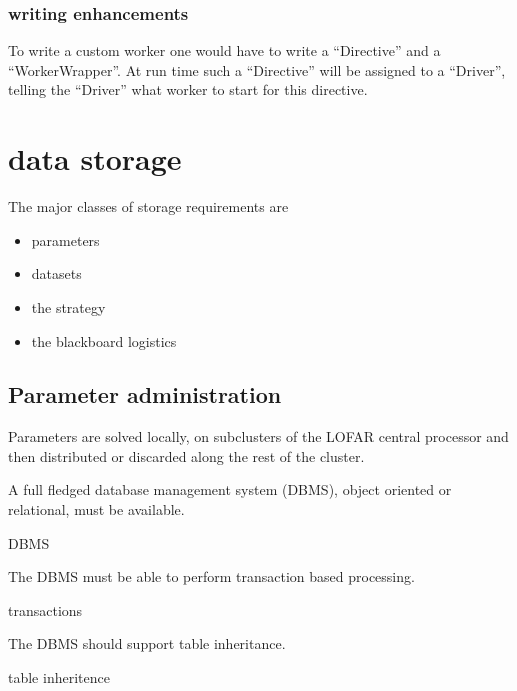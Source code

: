 \documentclass[]{lofar}
\begin{document}
      \subsubsection{writing enhancements}

        To write a custom worker one would have to write a ``Directive''
        and a ``WorkerWrapper''. At run time such a ``Directive'' will be
        assigned to a ``Driver'', telling the ``Driver'' what worker
        to start for this directive.

  \section{data storage}
  \label{sec:data-storage}\hypertarget{sec:data-storage}{}

    The major classes of storage requirements are

    \begin{itemize}
      \item parameters
      \item datasets
      \item the strategy
      \item the blackboard logistics
    \end{itemize}

    \subsection{Parameter administration}
    \label{subsec:parameter-administration}\hypertarget{subsec:parameter-administration}{}

      Parameters are solved locally, on subclusters of the LOFAR
      central processor and then distributed or discarded along the
      rest of the cluster.

      \begin{prerequisite}
        A full fledged database management system (DBMS),
        object oriented or relational, must be available.
        \caption{DBMS\label{pre:dbms}}
      \end{prerequisite}

      \begin{prerequisite}
        The DBMS must be able to perform transaction based processing.
        \caption{transactions\label{pre:transactions}}
      \end{prerequisite}

      \begin{prerequisite}
        The DBMS should support table inheritance.
        \caption{table inheritence\label{pre:table-inheritance}}
      \end{prerequisite}
\end{document}
